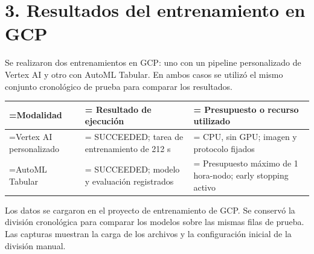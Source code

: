 \FloatBarrier


\section{3. Resultados del entrenamiento en GCP}

Se realizaron dos entrenamientos en GCP: uno con un pipeline personalizado de Vertex AI y otro con AutoML Tabular. En ambos casos se utilizó el mismo conjunto cronológico de prueba para comparar los resultados.


\par\medskip\begin{fullwidth}\noindent
\begin{minipage}{\linewidth}\small
\setlength{\tabcolsep}{5pt}\renewcommand{\arraystretch}{1.24}
\begin{tabularx}{\linewidth}{@{}>{\hsize=0.80488\hsize\linewidth=\hsize\RaggedRight\arraybackslash}X>{\hsize=1.09756\hsize\linewidth=\hsize\RaggedRight\arraybackslash}X>{\hsize=1.09756\hsize\linewidth=\hsize\RaggedRight\arraybackslash}X@{}}
\toprule
\textbf{Modalidad} & \textbf{Resultado de ejecución} & \textbf{Presupuesto o recurso utilizado} \\
\midrule
Vertex AI personalizado & SUCCEEDED; tarea de entrenamiento de 212 s & CPU, sin GPU; imagen y protocolo fijados \\
AutoML Tabular & SUCCEEDED; modelo y evaluación registrados & Presupuesto máximo de 1 hora-nodo; early stopping activo \\
\bottomrule
\end{tabularx}
\end{minipage}
\end{fullwidth}\par\medskip

\FloatBarrier


Los datos se cargaron en el proyecto de entrenamiento de GCP. Se conservó la división cronológica para comparar los modelos sobre las mismas filas de prueba. Las capturas muestran la carga de los archivos y la configuración inicial de la división manual.



\FloatBarrier

